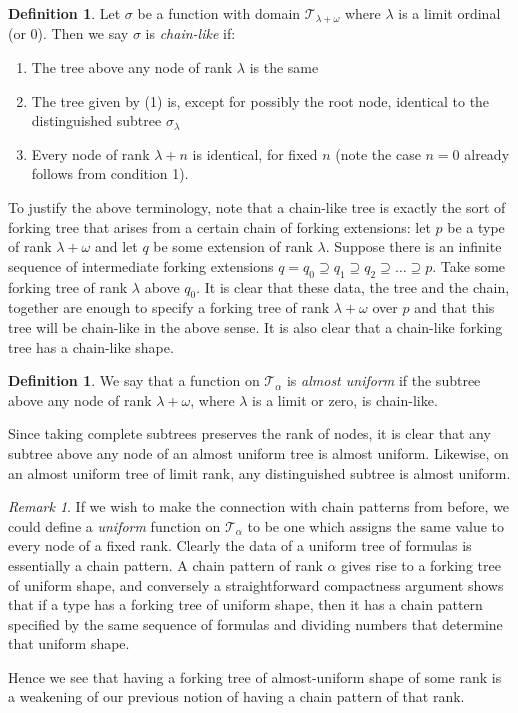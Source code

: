 \documentclass{article}
\theoremstyle{remark}
\newtheorem{remark}[theorem]{Remark}
\theoremstyle{definition}
\newtheorem{definition}[theorem]{Definition}
\begin{document}
\begin{definition}
    Let $\sigma$ be a function with domain $\mathcal{T}_{\lambda+\omega}$ where $\lambda$ is a limit ordinal (or 0). Then we say $\sigma$ is \textit{chain-like} if:
    \begin{enumerate}
        \item The tree above any node of rank $\lambda$ is the same 
        \item The tree given by (1) is, except for possibly the root node, identical to the distinguished subtree $\sigma_\lambda$
        \item Every node of rank $\lambda+n$ is identical, for fixed $n$ (note the case $n=0$ already follows from condition 1).
    \end{enumerate}
\end{definition}
To justify the above terminology, note that a chain-like tree is exactly the sort of forking tree that arises from a certain chain of forking extensions: let $p$ be a type of rank $\lambda+\omega$ and let $q$ be some extension of rank $\lambda$. Suppose there is an infinite sequence of intermediate forking extensions $q=q_0\supseteq q_1\supseteq q_2\supseteq\dots\supseteq p$. Take some forking tree of rank $\lambda$ above $q_0$. It is clear that these data, the tree and the chain, together are enough to specify a forking tree of rank $\lambda+\omega$ over $p$ and that this tree will be chain-like in the above sense. It is also clear that a chain-like forking tree has a chain-like shape.

\begin{definition}
    We say that a function on $\mathcal{T}_\alpha$ is \textit{almost uniform} if the subtree above any node of rank $\lambda+\omega$, where $\lambda$ is a limit or zero, is chain-like.
\end{definition}

Since taking complete subtrees preserves the rank of nodes, it is clear that any subtree above any node of an almost uniform tree is almost uniform. Likewise, on an almost uniform tree of limit rank, any distinguished subtree is almost uniform.

\begin{remark}
    If we wish to make the connection with chain patterns from before, we could define a \textit{uniform} function on $\mathcal{T}_\alpha$ to be one which assigns the same value to every node of a fixed rank. Clearly the data of a uniform tree of formulas is essentially a chain pattern. A chain pattern of rank $\alpha$ gives rise to a forking tree of uniform shape, and conversely a straightforward compactness argument shows that if a type has a forking tree of uniform shape, then it has a chain pattern specified by the same sequence of formulas and dividing numbers that determine that uniform shape.

    Hence we see that having a forking tree of almost-uniform shape of some rank is a weakening of our previous notion of having a chain pattern of that rank.
\end{remark}
\end{document}
